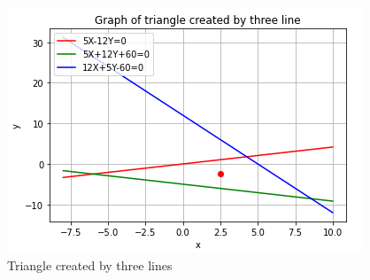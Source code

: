 \documentclass[journal,12pt,twocolumn]{IEEEtran}
\begin{document}
\begin{figure}[!ht]
    \centering
    \includegraphics[width=\columnwidth]{graph.png}
    \caption{Triangle created by three lines}
    \label{fig:}
\end{figure}
\end{document}
